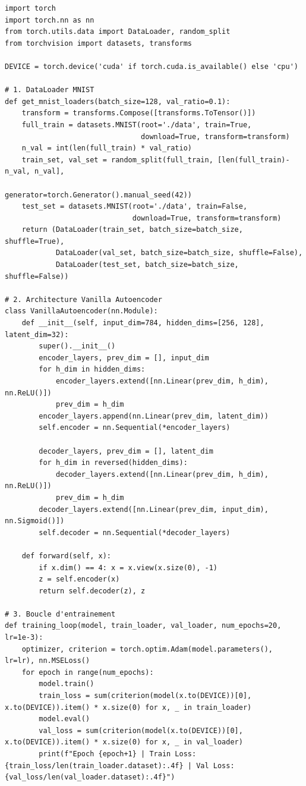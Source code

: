\documentclass[11pt,a4paper]{report}
\begin{document}
\begin{lstlisting}[caption=Pipeline de base du projet]
import torch
import torch.nn as nn
from torch.utils.data import DataLoader, random_split
from torchvision import datasets, transforms

DEVICE = torch.device('cuda' if torch.cuda.is_available() else 'cpu')

# 1. DataLoader MNIST
def get_mnist_loaders(batch_size=128, val_ratio=0.1):
    transform = transforms.Compose([transforms.ToTensor()])
    full_train = datasets.MNIST(root='./data', train=True,
                                download=True, transform=transform)
    n_val = int(len(full_train) * val_ratio)
    train_set, val_set = random_split(full_train, [len(full_train)-n_val, n_val],
                                      generator=torch.Generator().manual_seed(42))
    test_set = datasets.MNIST(root='./data', train=False,
                              download=True, transform=transform)
    return (DataLoader(train_set, batch_size=batch_size, shuffle=True),
            DataLoader(val_set, batch_size=batch_size, shuffle=False),
            DataLoader(test_set, batch_size=batch_size, shuffle=False))

# 2. Architecture Vanilla Autoencoder
class VanillaAutoencoder(nn.Module):
    def __init__(self, input_dim=784, hidden_dims=[256, 128], latent_dim=32):
        super().__init__()
        encoder_layers, prev_dim = [], input_dim
        for h_dim in hidden_dims:
            encoder_layers.extend([nn.Linear(prev_dim, h_dim), nn.ReLU()])
            prev_dim = h_dim
        encoder_layers.append(nn.Linear(prev_dim, latent_dim))
        self.encoder = nn.Sequential(*encoder_layers)

        decoder_layers, prev_dim = [], latent_dim
        for h_dim in reversed(hidden_dims):
            decoder_layers.extend([nn.Linear(prev_dim, h_dim), nn.ReLU()])
            prev_dim = h_dim
        decoder_layers.extend([nn.Linear(prev_dim, input_dim), nn.Sigmoid()])
        self.decoder = nn.Sequential(*decoder_layers)

    def forward(self, x):
        if x.dim() == 4: x = x.view(x.size(0), -1)
        z = self.encoder(x)
        return self.decoder(z), z

# 3. Boucle d'entrainement
def training_loop(model, train_loader, val_loader, num_epochs=20, lr=1e-3):
    optimizer, criterion = torch.optim.Adam(model.parameters(), lr=lr), nn.MSELoss()
    for epoch in range(num_epochs):
        model.train()
        train_loss = sum(criterion(model(x.to(DEVICE))[0], x.to(DEVICE)).item() * x.size(0) for x, _ in train_loader)
        model.eval()
        val_loss = sum(criterion(model(x.to(DEVICE))[0], x.to(DEVICE)).item() * x.size(0) for x, _ in val_loader)
        print(f"Epoch {epoch+1} | Train Loss: {train_loss/len(train_loader.dataset):.4f} | Val Loss: {val_loss/len(val_loader.dataset):.4f}")
\end{lstlisting}
\end{document}
